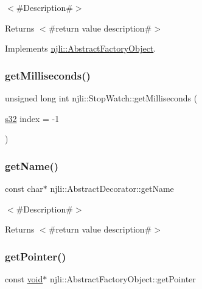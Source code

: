 $<$\#\+Description\#$>$

\begin{DoxyReturn}{Returns}
$<$\#return value description\#$>$ 
\end{DoxyReturn}


Implements \mbox{\hyperlink{classnjli_1_1_abstract_factory_object_af4151e41b80d5bc3fc42822c67fc2278}{njli\+::\+Abstract\+Factory\+Object}}.

\mbox{\label{classnjli_1_1_stop_watch_aa18f65d2873cb83258cca59d2e9e600f}} 
\subsubsection{\texorpdfstring{get\+Milliseconds()}{getMilliseconds()}}
{\footnotesize\ttfamily unsigned long int njli\+::\+Stop\+Watch\+::get\+Milliseconds (\begin{DoxyParamCaption}\item[{\mbox{\hyperlink{_util_8h_aa62c75d314a0d1f37f79c4b73b2292e2}{s32}}}]{index = {\ttfamily -\/1} }\end{DoxyParamCaption})}

\mbox{\label{classnjli_1_1_stop_watch_ad41266885be835f3ee602311e20877a4}} 
\subsubsection{\texorpdfstring{get\+Name()}{getName()}}
{\footnotesize\ttfamily const char$\ast$ njli\+::\+Abstract\+Decorator\+::get\+Name}

$<$\#\+Description\#$>$

\begin{DoxyReturn}{Returns}
$<$\#return value description\#$>$ 
\end{DoxyReturn}
\mbox{\label{classnjli_1_1_stop_watch_ac4ca71716ed832be357f15f8262c8448}} 
\subsubsection{\texorpdfstring{get\+Pointer()}{getPointer()}}
{\footnotesize\ttfamily const \mbox{\hyperlink{_thread_8h_af1e856da2e658414cb2456cb6f7ebc66}{void}}$\ast$ njli\+::\+Abstract\+Factory\+Object\+::get\+Pointer}

